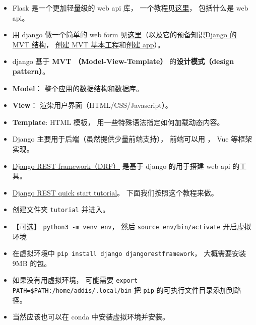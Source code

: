 

\begin{issues}
\issueDraft
\end{issues}

\begin{itemize}
\item Flask 是一个更加轻量级的 web api 库， 一个教程见\href{https://programminghistorian.org/en/lessons/creating-apis-with-python-and-flask}{这里}， 包括什么是 web api。
\item 用 django 做一个简单的 web form 见\href{https://www.geeksforgeeks.org/how-to-create-a-form-using-django-forms/}{这里}（以及它的预备知识\href{https://www.geeksforgeeks.org/django-project-mvt-structure}{Django 的 MVT 结构}， \href{https://www.geeksforgeeks.org/how-to-create-a-basic-project-using-mvt-in-django/}{创建 MVT 基本工程}和\href{https://www.geeksforgeeks.org/how-to-create-an-app-in-django/}{创建 app}）。
\item django 基于 \textbf{MVT （Model-View-Template）} 的\textbf{设计模式（design pattern）}。
\item \textbf{Model}： 整个应用的数据结构和数据库。
\item \textbf{View}： 渲染用户界面（HTML/CSS/Javascript）。
\item \textbf{Template}: HTML 模板， 用一些特殊语法指定如何加载动态内容。
\item Django 主要用于后端（虽然提供少量前端支持）， 前端可以用 ， Vue 等框架实现。
\item \href{https://www.django-rest-framework.org/}{Django REST framework（DRF）} 是基于 django 的用于搭建 web api 的工具。
\item \href{https://www.django-rest-framework.org/tutorial/quickstart/}{Django REST quick start tutorial}。 下面我们按照这个教程来做。
\item 创建文件夹 \verb`tutorial` 并进入。
\item 【可选】 \verb`python3 -m venv env`， 然后 \verb`source env/bin/activate` 开启虚拟环境
\item 在虚拟环境中 \verb`pip install django djangorestframework`， 大概需要安装 9MB 的包。
\item 如果没有用虚拟环境， 可能需要 \verb`export PATH=$PATH:/home/addis/.local/bin` 把 \verb`pip` 的可执行文件目录添加到路径。
\item 当然应该也可以在 conda 中安装虚拟环境并安装。

\end{itemize}
